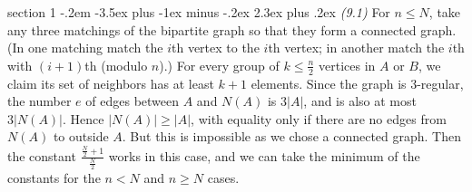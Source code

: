 \documentclass[12pt]{article}
\makeatletter
\theoremstyle{norm}
\newcommand{\rc}[1]{\frac{1}{#1}}
\newcommand{\sub}[0]{\subset}
\newcommand{\fl}[1]{\left\lfloor {#1}\right\rfloor}
\newenvironment{problem}{\@startsection
       {section}
       {1}
       {-.2em}
       {-3.5ex plus -1ex minus -.2ex}
       {2.3ex plus .2ex}
       {\pagebreak[3]%
       \large\bf\noindent{Problem }
       }
       }
       {%
       }
\makeatother
\begin{document}
\begin{problem}{\it(9.1)}
For $n\le N$, take any three matchings of the bipartite graph so that they  form a connected graph. (In one matching match the $i$th vertex to the $i$th vertex; in another match the $i$th with $(i+1)$th (modulo $n$).) For every group of $k\le \frac n2$ vertices in $A$ or $B$, we claim its set of neighbors has at least $k+1$ elements. Since the graph is 3-regular, the number $e$ of edges between $A$ and $N(A)$ is $3|A|$, and is also at most $3|N(A)|$. Hence $|N(A)|\ge |A|$, with equality only if there are no edges from $N(A)$ to outside $A$. But this is impossible as we chose a connected graph. 
Then the constant $\frac{\frac N2+1}{\frac N2}$ works in this case, and we can take the minimum of the constants for the $n<N$ and $n\ge N$ cases. 


\end{problem}
\end{document}
